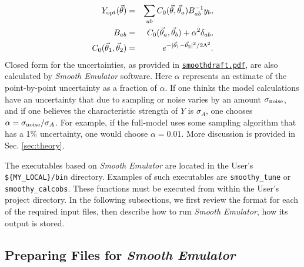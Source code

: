 \documentclass[UserManual.tex]{subfiles}
\begin{document}
\begin{eqnarray}\label{eq:Yemu}
Y_{\rm opt}(\vec{\theta})&=&\sum_{ab}C_0(\vec{\theta},\vec{\theta}_a)B^{-1}_{ab}y_b,\\
\nonumber
\label{eq:Bdef}
B_{ab}&=&C_0(\vec{\theta}_a,\vec{\theta}_b)+\alpha^2\delta_{ab},\\
\nonumber
C_0(\vec{\theta}_1,\vec{\theta}_2)&=&e^{-|\vec{\theta}_1-\vec{\theta}_2|^2/2\Lambda^2}.
\end{eqnarray}
Closed form for the uncertainties, as provided in \href{./smoothdraft.pdf}{{\tt smoothdraft.pdf}}, are also calculated by {\it Smooth Emulator} software. Here $\alpha$ represents an estimate of the point-by-point uncertainty as a fraction of $\alpha$. If one thinks the model calculations have an uncertainty that due to sampling or noise varies by an amount $\sigma_{\rm noise}$, and if one believes the characteristic strength of $Y$ is $\sigma_A$, one chooses $\alpha=\sigma_{\rm noise}/\sigma_A$. For example, if the full-model uses some sampling algorithm that has a 1\% uncertainty, one would choose $\alpha=0.01$. More discussion is provided in Sec. \ref{sec:theory}.   

The executables based on {\it Smooth Emulator} are located in the User's {\tt \$\{MY\_LOCAL\}/bin} directory. Examples of such executables are {\tt smoothy\_tune} or {\tt smoothy\_calcobs}. These functions must be executed from within the User's project directory. In the following subsections, we first review the format for each of the required input files, then describe how to run {\it Smooth Emulator}, how its output is stored.

\subsection{Preparing Files for {\it Smooth Emulator}}
\end{document}

